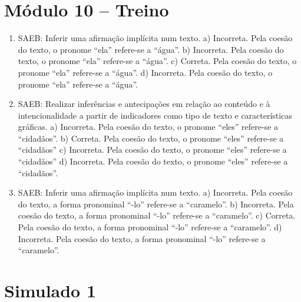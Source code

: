 \section*{Módulo 10 – Treino}

\begin{enumerate}
\item
SAEB: Inferir uma afirmação implícita num texto.
a) Incorreta. Pela coesão do texto, o pronome ``ela'' refere-se a
``água''.
b) Incorreta. Pela coesão do texto, o pronome ``ela'' refere-se a
``água''.
c) Correta. Pela coesão do texto, o pronome ``ela'' refere-se a
``água''.
d) Incorreta. Pela coesão do texto, o pronome ``ela'' refere-se a
``água''.

\item
SAEB: Realizar inferências e antecipações em relação ao conteúdo
e à intencionalidade a partir de indicadores como tipo de texto e
características gráficas.
a) Incorreta. Pela coesão do texto, o pronome ``eles'' refere-se a
``cidadãos''.
b) Correta. Pela coesão do texto, o pronome ``eles'' refere-se a
``cidadãos''
c) Incorreta. Pela coesão do texto, o pronome ``eles'' refere-se a
``cidadãos''
d) Incorreta. Pela coesão do texto, o pronome ``eles'' refere-se a
``cidadãos''.

\item
SAEB: Inferir uma afirmação implícita num texto.
a) Incorreta. Pela coesão do texto, a forma pronominal ``-lo'' refere-se a
``caramelo''.
b) Incorreta. Pela coesão do texto, a forma pronominal ``-lo'' refere-se a
``caramelo''.
c) Correta. Pela coesão do texto, a forma pronominal ``-lo'' refere-se a
``caramelo''.
d) Incorreta. Pela coesão do texto, a forma pronominal ``-lo'' refere-se a
``caramelo''.
\end{enumerate}

\section*{Simulado 1}


